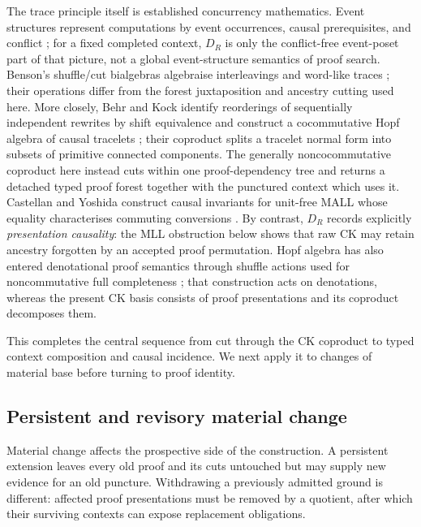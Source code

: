 \documentclass[10pt,a4paper]{article}
\theoremstyle{plain}
\theoremstyle{definition}
\theoremstyle{remark}
\begin{document}
The trace principle itself is established concurrency mathematics.  Event
structures represent computations by event occurrences, causal
prerequisites, and conflict \cite{nielsenplotkinwinskel1981}; for a fixed
completed context, \(D_R\) is only the conflict-free event-poset part of
that picture, not a global event-structure semantics of proof search.
Benson's shuffle/cut bialgebras algebraise interleavings and word-like
traces \cite{benson1989}; their operations differ from the forest
juxtaposition and ancestry cutting used here.  More closely, Behr and Kock
identify reorderings of sequentially independent rewrites by shift
equivalence and construct a cocommutative Hopf algebra of causal tracelets
\cite{behrkock2022}; their coproduct splits a tracelet normal form into
subsets of primitive connected components.  The generally noncocommutative
coproduct here instead cuts within one proof-dependency tree and returns a
detached typed proof forest together with the punctured context which uses
it.  Castellan and Yoshida construct causal invariants for unit-free MALL
whose equality characterises commuting conversions
\cite{castellanyoshida2019}.  By contrast, \(D_R\) records explicitly
\emph{presentation causality}: the MLL obstruction below shows that raw CK
may retain ancestry forgotten by an accepted proof permutation.  Hopf
algebra has also entered denotational proof semantics through shuffle
actions used for noncommutative full completeness
\cite{blutescott1998}; that construction acts on denotations, whereas the
present CK basis consists of proof presentations and its coproduct
decomposes them.

This completes the central sequence from cut through the CK coproduct to
typed context composition and causal incidence.  We next apply it to
changes of material base before turning to proof identity.
\subsection{Persistent and revisory material change}

Material change affects the prospective side of the construction.  A
persistent extension leaves every old proof and its cuts untouched but may
supply new evidence for an old puncture.  Withdrawing a previously admitted
ground is different: affected proof presentations must be removed by a
quotient, after which their surviving contexts can expose replacement
obligations.
\end{document}
